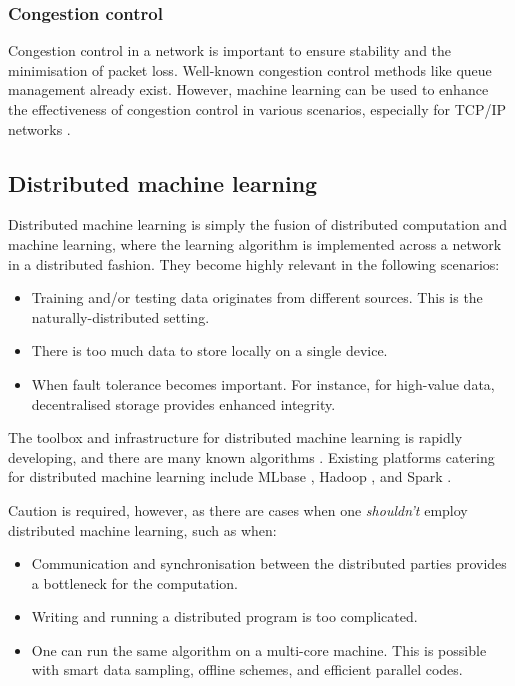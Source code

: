 \documentclass[twocolumn, aps, rmp, amsmath, amssymb, nofootinbib, superscriptaddress, longbibliography, floatfix, table-of-contents, eqsecnum]{revtex4}
\begin{document}
\subsubsection{Congestion control}

Congestion control in a network is important to ensure stability and the minimisation of packet loss. Well-known congestion control methods like queue management already exist. However, machine learning can be used to enhance the effectiveness of congestion control in various scenarios, especially for TCP/IP networks \cite{bib:liu2002end, bib:barman2004model, bib:el2005improving}. 

\subsection{Distributed machine learning}

Distributed machine learning is simply the fusion of distributed computation and machine learning, where the learning algorithm is implemented across a network in a distributed fashion. They become highly relevant in the following scenarios:
\begin{itemize}
\item Training and/or testing data originates from different sources. This is the naturally-distributed setting.%
\item There is too much data to store locally on a single device.
\item When fault tolerance becomes important. For instance, for high-value data, decentralised storage provides enhanced integrity.
\end{itemize}

The toolbox and infrastructure for distributed machine learning is rapidly developing, and there are many known algorithms \cite{bib:peteiro2013survey, bib:florian2013}. Existing platforms catering for distributed machine learning include MLbase \cite{bib:MLbase}, Hadoop \cite{bib:white2012hadoop}, and Spark \cite{bib:shanahan2015large}.

Caution is required, however, as there are cases when one \textit{shouldn't} employ distributed machine learning, such as when:
\begin{itemize}
\item Communication and synchronisation between the distributed parties provides a bottleneck for the computation.
\item Writing and running a distributed program is too complicated.
\item One can run the same algorithm on a multi-core machine. This is possible with smart data sampling, offline schemes, and efficient parallel codes.
\end{itemize}
\end{document}

